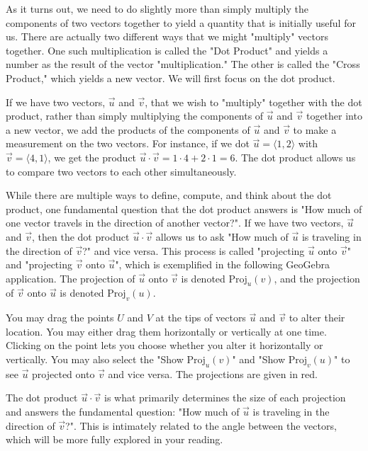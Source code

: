 \documentclass{ximera}
\begin{document}
As it turns out, we need to do slightly more than simply multiply the components of two vectors together to yield a quantity that is initially useful for us. There are actually two different ways that we might "multiply" vectors together. One such multiplication is called the "Dot Product" and yields a number as the result of the vector "multiplication." The other is called the "Cross Product," which yields a new vector. We will first focus on the dot product.

If we have two vectors, $\vec u$ and $\vec v$, that we wish to "multiply" together with the dot product, rather than simply multiplying the components of $\vec u$ and $\vec v$ together into a new vector, we add the products of the components of $\vec u$ and $\vec v$ to make a measurement on the two vectors. For instance, if we dot $\vec u=\langle 1,2\rangle$ with $\vec v=\langle 4,1\rangle$, we get the product $\vec u\cdot\vec v=1\cdot 4+2\cdot 1=6$. The dot product allows us to compare two vectors to each other simultaneously.

While there are multiple ways to define, compute, and think about the dot product, one fundamental question that the dot product answers is "How much of one vector travels in the direction of another vector?". If we have two vectors, $\vec u$ and $\vec v$, then the dot product $\vec u\cdot\vec v$ allows us to ask "How much of $\vec u$ is traveling in the direction of $\vec v$?" and vice versa. This process is called "projecting $\vec u$ onto $\vec v$" and "projecting $\vec v$ onto $\vec u$", which is exemplified in the following GeoGebra application. The projection of $\vec u$ onto $\vec v$ is denoted $\text{Proj}_u(v)$, and the projection of $\vec v$ onto $\vec u$ is denoted $\text{Proj}_v(u)$.

You may drag the points $U$ and $V$ at the tips of vectors $\vec u$ and $\vec v$ to alter their location. You may either drag them horizontally or vertically at one time. Clicking on the point lets you choose whether you alter it horizontally or vertically. You may also select the "Show $\text{Proj}_u(v)$" and "Show $\text{Proj}_v(u)$" to see $\vec u$ projected onto $\vec v$ and vice versa. The projections are given in red.

\begin{center}
\end{center}

The dot product $\vec u\cdot\vec v$ is what primarily determines the size of each projection and answers the fundamental question: "How much of $\vec u$ is traveling in the direction of $\vec v$?". This is intimately related to the angle between the vectors, which will be more fully explored in your reading.
\end{document}
